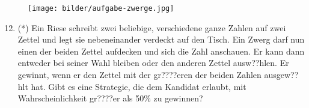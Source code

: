 \documentclass[a4paper,ngerman,12pt]{zirkelblatt1415}
\theoremstyle{definition}
\theoremstyle{plain}
\theoremstyle{remark}
\begin{document}
\begin{figure}[H]
  \centering
  \texttt{[image: bilder/aufgabe-zwerge.jpg]}
\end{figure}

\begin{enumerate}
\setcounter{enumi}{11}
\item (*) Ein Riese schreibt zwei beliebige, verschiedene ganze Zahlen auf zwei Zettel und legt sie nebeneinander verdeckt auf den Tisch. Ein Zwerg darf nun einen der beiden Zettel aufdecken und sich die Zahl anschauen. Er kann dann entweder bei seiner Wahl bleiben oder den anderen Zettel ausw??hlen. Er gewinnt, wenn er den Zettel mit der gr????eren der beiden Zahlen ausgew??hlt hat. Gibt es eine Strategie, die dem Kandidat erlaubt, mit Wahrscheinlichkeit gr????er als 50\% zu gewinnen?
\end{enumerate}
\end{document}
